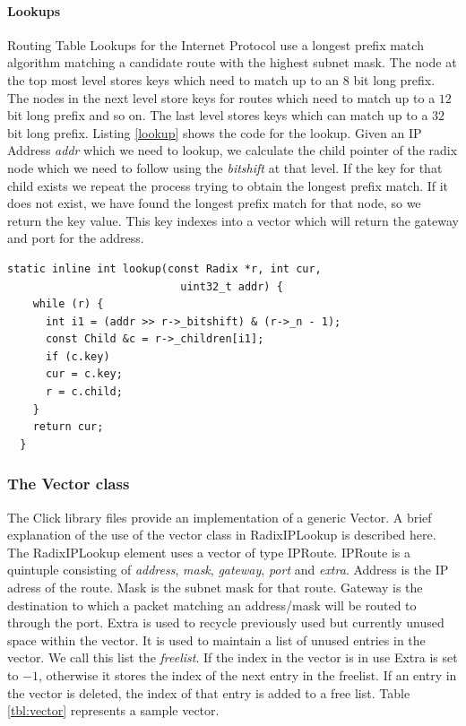 \documentclass[12pt,a4paper]{article}
\begin{document}
\paragraph{Lookups}
Routing Table Lookups for the Internet Protocol use a longest prefix match algorithm matching a candidate route with the highest subnet mask. The node at the top most level stores keys which need to match up to an 8 bit long prefix. The nodes in the next level store keys for routes which need to match up to a $12$ bit long prefix and so on. The last level stores keys which can match up to a $32$ bit long prefix. Listing \ref{lookup} shows the code for the lookup. Given an IP Address \emph{addr} which we need to lookup, we calculate the child pointer of the radix node which we need to follow using the \emph{bitshift} at that level. If the key for that child exists we repeat the process trying to obtain the longest prefix match. If it does not exist, we have found the longest prefix match for that node, so we return the key value. This key indexes into a vector which will return the gateway and port for the address.
\begin{lstlisting}[caption = The lookup function, label=lookup]
  static inline int lookup(const Radix *r, int cur, 
                           uint32_t addr) {
    while (r) {
      int i1 = (addr >> r->_bitshift) & (r->_n - 1);
      const Child &c = r->_children[i1];
      if (c.key)
      cur = c.key;
      r = c.child;
    }
    return cur;
  }
\end{lstlisting}
\subsubsection{The Vector class}
The Click library files provide an implementation of a generic Vector. A brief explanation of the use of the vector class in RadixIPLookup is described here. The RadixIPLookup element uses a vector of type IPRoute. IPRoute is a quintuple consisting of \emph{address}, \emph{mask}, \emph{gateway}, \emph{port} and \emph{extra}. Address is the IP adress of the route. Mask is the subnet mask for that route. Gateway is the destination to which a packet matching an address/mask will be routed to through the port. Extra is used to recycle previously used but currently unused space within the vector. It is used to maintain a list of unused entries in the vector. We call this list the \emph{freelist}. If the index in the vector is in use Extra is set to $-1$, otherwise it stores the index of the next entry in the freelist. If an entry in the vector is deleted, the index of that entry is added to a free list. Table \ref{tbl:vector} represents a sample vector.
\end{document}
